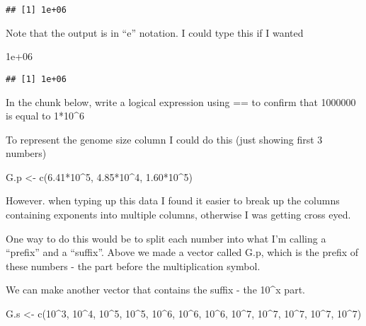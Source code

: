 \documentclass[
]{book}
\newenvironment{Shaded}{\begin{snugshade}}{\end{snugshade}}
\newcommand{\DecValTok}[1]{\textcolor[rgb]{0.00,0.00,0.81}{#1}}
\newcommand{\FloatTok}[1]{\textcolor[rgb]{0.00,0.00,0.81}{#1}}
\newcommand{\FunctionTok}[1]{\textcolor[rgb]{0.00,0.00,0.00}{#1}}
\newcommand{\NormalTok}[1]{#1}
\newcommand{\OtherTok}[1]{\textcolor[rgb]{0.56,0.35,0.01}{#1}}
\newcommand{\SpecialCharTok}[1]{\textcolor[rgb]{0.00,0.00,0.00}{#1}}
\begin{document}
\begin{verbatim}
## [1] 1e+06
\end{verbatim}

Note that the output is in ``e'' notation. I could type this if I wanted

\begin{Shaded}
\begin{Highlighting}[]
\FloatTok{1e+06}
\end{Highlighting}
\end{Shaded}

\begin{verbatim}
## [1] 1e+06
\end{verbatim}

In the chunk below, write a logical expression using == to confirm that 1000000 is equal to 1*10\^{}6

To represent the genome size column I could do this (just showing first 3 numbers)

\begin{Shaded}
\begin{Highlighting}[]
\NormalTok{G.p }\OtherTok{\textless{}{-}} \FunctionTok{c}\NormalTok{(}\FloatTok{6.41}\SpecialCharTok{*}\DecValTok{10}\SpecialCharTok{\^{}}\DecValTok{5}\NormalTok{, }\FloatTok{4.85}\SpecialCharTok{*}\DecValTok{10}\SpecialCharTok{\^{}}\DecValTok{4}\NormalTok{, }\FloatTok{1.60}\SpecialCharTok{*}\DecValTok{10}\SpecialCharTok{\^{}}\DecValTok{5}\NormalTok{)}
\end{Highlighting}
\end{Shaded}

However. when typing up this data I found it easier to break up the columns containing exponents into multiple columns, otherwise I was getting cross eyed.

One way to do this would be to split each number into what I'm calling a ``prefix'' and a ``suffix''. Above we made a vector called G.p, which is the prefix of these numbers - the part before the multiplication symbol.

We can make another vector that contains the suffix - the 10\^{}x part.

\begin{Shaded}
\begin{Highlighting}[]
\NormalTok{G.s }\OtherTok{\textless{}{-}} \FunctionTok{c}\NormalTok{(}\DecValTok{10}\SpecialCharTok{\^{}}\DecValTok{3}\NormalTok{, }\DecValTok{10}\SpecialCharTok{\^{}}\DecValTok{4}\NormalTok{,    }\DecValTok{10}\SpecialCharTok{\^{}}\DecValTok{5}\NormalTok{, }\DecValTok{10}\SpecialCharTok{\^{}}\DecValTok{5}\NormalTok{, }\DecValTok{10}\SpecialCharTok{\^{}}\DecValTok{6}\NormalTok{, }\DecValTok{10}\SpecialCharTok{\^{}}\DecValTok{6}\NormalTok{, }\DecValTok{10}\SpecialCharTok{\^{}}\DecValTok{6}\NormalTok{, }\DecValTok{10}\SpecialCharTok{\^{}}\DecValTok{7}\NormalTok{, }\DecValTok{10}\SpecialCharTok{\^{}}\DecValTok{7}\NormalTok{, }\DecValTok{10}\SpecialCharTok{\^{}}\DecValTok{7}\NormalTok{, }\DecValTok{10}\SpecialCharTok{\^{}}\DecValTok{7}\NormalTok{, }\DecValTok{10}\SpecialCharTok{\^{}}\DecValTok{7}\NormalTok{)}
\end{Highlighting}
\end{Shaded}
\end{document}
